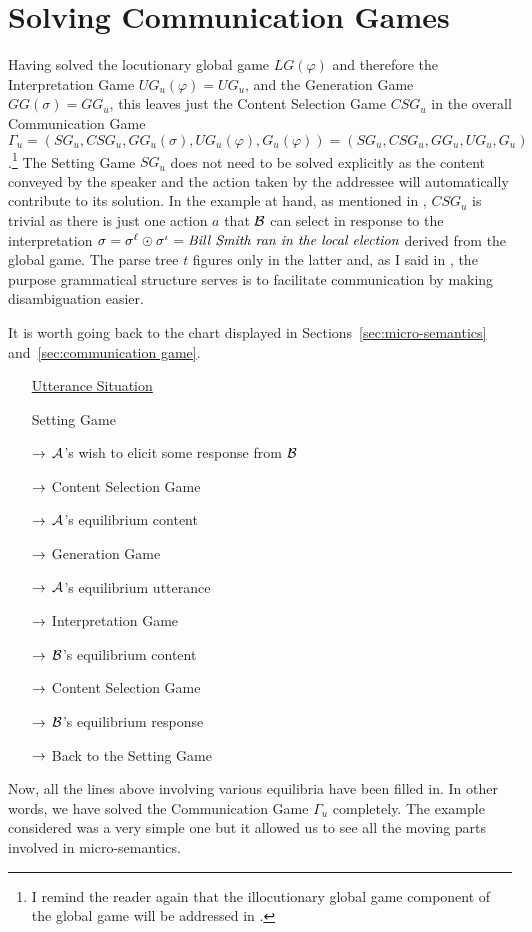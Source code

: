 \section{Solving Communication Games} \label{solving communication games}
Having solved the locutionary global game $LG(\varphi)$ and therefore the Interpretation Game $UG_u(\varphi) = UG_u$, and the Generation Game $GG(\sigma) = GG_u$, this leaves just the Content Selection Game $CSG_u$ in the overall Communication Game 
$\Gamma_u = (SG_u, CSG_u, GG_u(\sigma), UG_u(\varphi), G_u(\varphi)) = (SG_u, CSG_u, GG_u, UG_u, G_u)$.\footnote{I remind the reader again that the illocutionary global game component of the global game will be addressed in .} The Setting Game $SG_u$ does not need to be solved explicitly as the content conveyed by the speaker and the action taken by the addressee will automatically contribute to its solution. In the example at hand, as mentioned in , $CSG_u$ is trivial as there is just one action $a$ that $\cal B$ can select in response to the interpretation $\sigma = \sigma^{\ell} \odot \sigma^{\iota} = \emph{Bill Smith ran in the local election}$ derived from the global game. The parse tree $t$ figures only in the latter and, as I said in , the purpose grammatical structure serves is to facilitate communication by making disambiguation easier.

It is worth going back to the chart displayed in Sections~\ref{sec:micro-semantics} and~\ref{sec:communication game}.
\begin{enumerate}\setlength{\itemsep}{0pt}
\item[] \underline{Utterance Situation}
\item[] Setting Game
\item[$\rightarrow$] $\cal A$'s wish to elicit some response from $\cal B$
\item[$\rightarrow$] Content Selection Game
\item[$\rightarrow$] $\cal A$'s equilibrium content
\item[$\rightarrow$] Generation Game
\item[$\rightarrow$] $\cal A$'s equilibrium utterance
\item[$\rightarrow$] Interpretation Game
\item[$\rightarrow$] $\cal B$'s equilibrium content
\item[$\rightarrow$] Content Selection Game
\item[$\rightarrow$] $\cal B$'s equilibrium response
\item[$\rightarrow$] Back to the Setting Game
\end{enumerate}
Now, all the lines above involving various equilibria have been filled in. In other words, we have solved the Communication Game $\Gamma_u$ completely. The example considered was a very simple one but it allowed us to see all the moving parts involved in micro-semantics.

